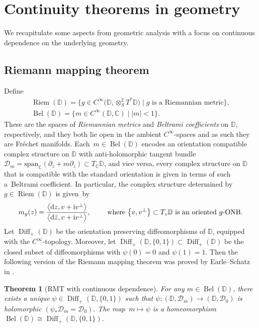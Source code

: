 \documentclass[pdftex]{sigma}
\numberwithin{equation}{section}
\newtheorem{Theorem}{Theorem}[section]
\theoremstyle{definition}
\newcommand{\C}{\mathbb{C}} %
\newcommand{\DD}{\mathbb{D}} %
\newcommand{\1}{{\bf 1}}
\newcommand{\D}{\mathscr{D}}
\DeclareMathOperator{\Diff}{Diff}
\DeclareMathOperator{\Riem}{Riem}
\DeclareMathOperator{\Bel}{Bel}
\begin{document}
\appendix

\section{Continuity theorems in geometry}\label{s_appa}

We recapitulate some aspects from geometric analysis with a focus on continuous dependence on the underlying geometry.


\subsection{Riemann mapping theorem}\label{s_RMT}
Define
\begin{gather*}
\Riem(\DD)= \big\{g\in C^\infty\bigl(\DD,\otimes_S^2T^*\DD\bigr)\mid g\text{ is a Riemannian metric}\big\},\\
\Bel(\DD) = \{m\in C^\infty(\DD,\C)\mid |m| < 1\}.
\end{gather*}
These are the spaces of {\it Riemannian metrics} and {\it Beltrami coefficients} on $\DD$, respectively, and they both lie open in the ambient $C^\infty$-spaces and as such they are Fr{\'e}chet manifolds. Each~${m\in \Bel(\DD)}$ encodes an orientation compatible complex structure on $\DD$ with anti-holomorphic tangent bundle
$
\D_m = \mathrm{span}_\C(\partial_{\bar z} + m \partial_z)\subset T_\C \DD$,
and vice versa, every complex structure on $\DD$ that is compatible with the standard orientation is given in terms of such a~Beltrami coefficient. In particular, the complex structure determined by $g\in \Riem(\DD)$ is given~by
\begin{equation*}
m_g(z)=\frac{\big\langle {\rm d}z,v+{\rm i}v^\perp\big\rangle}{\big\langle {\rm d}\bar z,v+{\rm i}v^\perp\big\rangle},\qquad \text{ where } \big\{v,v^\perp\big\}\subset T_z \DD \text{ is an oriented $g$-ONB}.
\end{equation*}
 Let $\Diff_+(\DD)$ be the orientation preserving diffeomorphisms of $\DD$, equipped with the $C^\infty$-topology. Moreover, let $\Diff_{+}(\DD,\{0,1\})\subset \Diff_+(\DD)$ be the closed subset of diffeomorphisms with $\psi(0)=0$ and $\psi(1)=1$.
 Then the following version of the Riemann mapping theorem was proved by
 Earle--Schatz in \cite[Theorem on p.~171]{EaSc70}.

\begin{Theorem}[RMT with continuous dependence]\label{RMT}
	For any $m\in \Bel(\DD)$, there exists a unique $\psi\in \Diff_+(\DD,\{0,1\})$ such that $\psi\colon (\DD,\D_m)\rightarrow (\DD,\D_0)$ is holomorphic $(\psi_*\D_m=\D_0)$. The map~${m\mapsto \psi}$ is a homeomorphism $
	\Bel(\DD)\cong \Diff_+(\DD,\{0,1\})$.
\end{Theorem}
\end{document}
